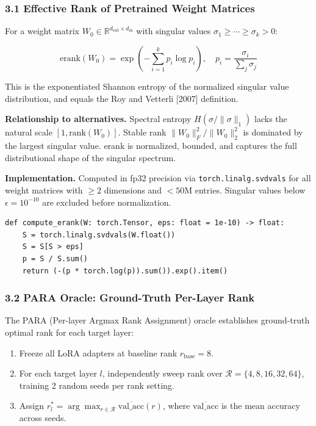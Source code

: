 
\subsubsection{3.1 Effective Rank of Pretrained Weight Matrices}

For a weight matrix $W_0 \in \mathbb{R}^{d_{\text{out}} \times d_{\text{in}}}$ with singular values $\sigma_1 \geq \cdots \geq \sigma_k > 0$:

$$\text{erank}(W_0) = \exp\!\left(-\sum_{i=1}^{k} p_i \log p_i\right), \quad p_i = \frac{\sigma_i}{\sum_j \sigma_j}$$

This is the exponentiated Shannon entropy of the normalized singular value distribution, and equals the Roy and Vetterli [2007] definition.

\textbf{Relationship to alternatives.} Spectral entropy $H(\sigma/\|\sigma\|_1)$ lacks the natural scale $[1, \text{rank}(W_0)]$. Stable rank $\|W_0\|_F^2 / \|W_0\|_2^2$ is dominated by the largest singular value. erank is normalized, bounded, and captures the full distributional shape of the singular spectrum.

\textbf{Implementation.} Computed in fp32 precision via \texttt{torch.linalg.svdvals} for all weight matrices with $\geq 2$ dimensions and $< 50$M entries. Singular values below $\epsilon = 10^{-10}$ are excluded before normalization.

\begin{verbatim}
def compute_erank(W: torch.Tensor, eps: float = 1e-10) -> float:
    S = torch.linalg.svdvals(W.float())
    S = S[S > eps]
    p = S / S.sum()
    return (-(p * torch.log(p)).sum()).exp().item()
\end{verbatim}

\subsubsection{3.2 PARA Oracle: Ground-Truth Per-Layer Rank}

The PARA (Per-layer Argmax Rank Assignment) oracle establishes ground-truth optimal rank for each target layer:

\begin{enumerate}
\item Freeze all LoRA adapters at baseline rank $r_{\text{base}} = 8$.
\item For each target layer $l$, independently sweep rank over $\mathcal{R} = \{4, 8, 16, 32, 64\}$, training 2 random seeds per rank setting.
\item Assign $r_l^* = \arg\max_{r \in \mathcal{R}} \overline{\text{val\_acc}}(r)$, where $\overline{\text{val\_acc}}$ is the mean accuracy across seeds.
\end{enumerate}

